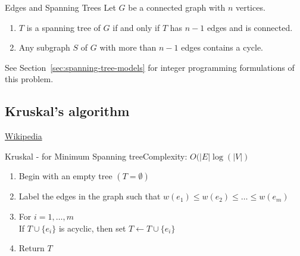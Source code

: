\begin{lemma}{Edges and Spanning Trees}{}
Let  $G$ be a  connected graph with $n$ vertices.  
\begin{enumerate}
\item $T$ is a spanning tree of $G$ if and only if $T$ has $n-1$ edges and is connected.
\item Any subgraph $S$ of $G$ with more than $n-1$ edges contains a cycle.
\end{enumerate}
\end{lemma}


See Section~\ref{sec:spanning-tree-models} for integer programming formulations of this problem.  
\subsection{Kruskal's algorithm}
\begin{resource}
\href{https://en.wikipedia.org/wiki/Kruskal\%27s_algorithm}{Wikipedia}
\end{resource}
\begin{general}{Kruskal  - for Minimum Spanning tree}{Complexity: $O(|E| \log(|V|)$}
\label{alg:Kruskal}
\begin{enumerate}
\item Begin with an empty tree $(T = \emptyset)$
\item Label the edges in the graph such that $w(e_1) \leq w(e_2) \leq \dots \leq w(e_m)$
\item For $i=1, \dots, m$\\
\indent  If $T \cup\{e_i\}$ is acyclic, then set $T \leftarrow T \cup \{e_i\}$
\item Return $T$
\end{enumerate}
\end{general}




